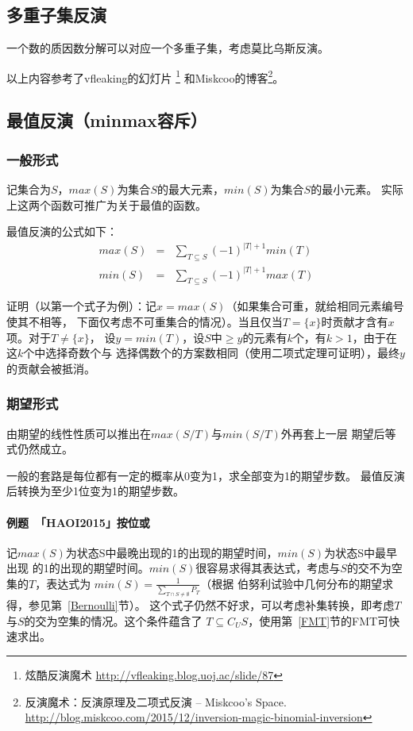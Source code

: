 \subsection{多重子集反演}
一个数的质因数分解可以对应一个多重子集，考虑莫比乌斯反演。

以上内容参考了vfleaking的幻灯片
\footnote{炫酷反演魔术 \url{http://vfleaking.blog.uoj.ac/slide/87}}
和Miskcoo的博客\footnote{反演魔术：反演原理及二项式反演 – Miskcoo's Space.\\
	\url{http://blog.miskcoo.com/2015/12/inversion-magic-binomial-inversion}
}。
\subsection{最值反演（minmax容斥）}
\subsubsection{一般形式}
记集合为$S$，$max(S)$为集合$S$的最大元素，$min(S)$为集合$S$的最小元素。
实际上这两个函数可推广为关于最值的函数。

最值反演的公式如下：
\begin{eqnarray*}
	max(S)&=&\sum_{T\subseteq S}{(-1)^{|T|+1}min(T)}\\
	min(S)&=&\sum_{T\subseteq S}{(-1)^{|T|+1}max(T)}
\end{eqnarray*}

证明（以第一个式子为例）：记$x=max(S)$（如果集合可重，就给相同元素编号使其不相等，
下面仅考虑不可重集合的情况）。当且仅当$T=\{x\}$时贡献才含有$x$项。对于$T\neq \{x\}$，
设$y=min(T)$，设$S$中$\geq y$的元素有$k$个，有$k>1$，由于在这$k$个中选择奇数个与
选择偶数个的方案数相同（使用二项式定理可证明），最终$y$的贡献会被抵消。

\subsubsection{期望形式}
由期望的线性性质可以推出在$max(S/T)$与$min(S/T)$外再套上一层
期望后等式仍然成立。

一般的套路是每位都有一定的概率从0变为1，求全部变为1的期望步数。
最值反演后转换为至少1位变为1的期望步数。

\paragraph{例题~「HAOI2015」按位或}
记$max(S)$为状态S中最晚出现的1的出现的期望时间，$min(S)$为状态S中最早出现
的1的出现的期望时间。$min(S)$很容易求得其表达式，考虑与$S$的交不为空集的$T$，表达式为
$min(S)=\frac{1}{\displaystyle \sum_{T\cap S \neq \emptyset}{P_T}}$（根据
伯努利试验中几何分布的期望求得，参见第~\ref{Bernoulli}节）。
这个式子仍然不好求，可以考虑补集转换，即考虑$T$与$S$的交为空集的情况。这个条件蕴含了
$T\subseteq C_US$，使用第~\ref{FMT}节的FMT可快速求出。

